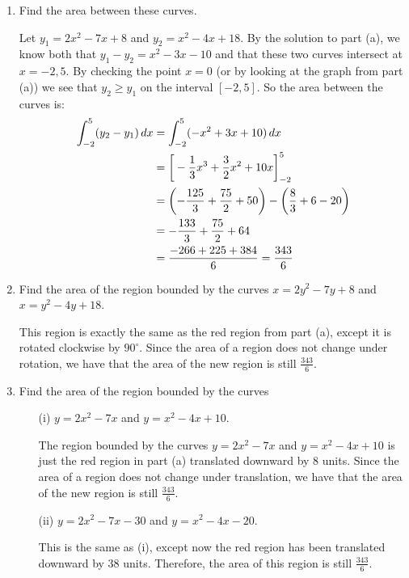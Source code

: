 \documentclass[]{ximera}
\begin{document}
\begin{problem}
\begin{enumerate}
		\item  Find the area between these curves.
		\begin{freeResponse}
		Let $y_1 = 2x^2-7x+8$ and $y_2=x^2-4x+18$.  
		By the solution to part (a), we know both that $y_1 - y_2 = x^2 - 3x - 10$ and that these two curves intersect at $x=-2, 5$.  
		By checking the point $x=0$ (or by looking at the graph from part (a)) we see that $y_2 \geq y_1$ on the interval $[-2,5]$.  
		So the area between the curves is:
			\begin{align*}
			\int_{-2}^5 (y_2 - y_1) \,d x &= \int_{-2}^5 (-x^2 + 3x + 10) \,d x  \\
			&= \bigg[ -\frac{1}{3} x^3 + \frac{3}{2} x^2 + 10x \bigg]_{-2}^5  \\
			&= \left(- \frac{125}{3} + \frac{75}{2} + 50 \right) - \left( \frac{8}{3} + 6 - 20 \right)  \\
			&= - \frac{133}{3} + \frac{75}{2} + 64  \\
			&= \frac{-266 + 225 + 384}{6} = \frac{343}{6}
			\end{align*}
		\end{freeResponse}
		
		\item  Find the area of the region bounded by the curves $x=2y^2-7y+8$ and $x=y^2-4y+18$.
		\begin{freeResponse}
		This region is exactly the same as the {\color{red} red region} from part (a), except it is rotated clockwise by $90^{\circ}$.  
		Since the area of a region does not change under rotation, we have that the area of the new region is still $\frac{343}{6}$.  
		\end{freeResponse}
		
		\item  Find the area of the region bounded by the curves
			\begin{enumerate}
				\item[(i)]  $y = 2x^2 - 7x$ and $y=x^2 - 4x + 10$.
				\begin{freeResponse}
				The region bounded by the curves $y = 2x^2 - 7x$ and $y=x^2 - 4x + 10$ is just the {\color{red} red region} in part (a) translated downward by 8 units.  
				Since the area of a region does not change under translation, we have that the area of the new region is still $\frac{343}{6}$.  
				\end{freeResponse}
				
				\item[(ii)]  $y=2x^2-7x-30$ and $y=x^2-4x-20$.
				\begin{freeResponse}
				This is the same as (i), except now the {\color{red} red region} has been translated downward by 38 units.  
				Therefore, the area of this region is still $\frac{343}{6}$.  
				\end{freeResponse}
				

\end{enumerate}
\end{enumerate}
\end{problem}
\end{document}
